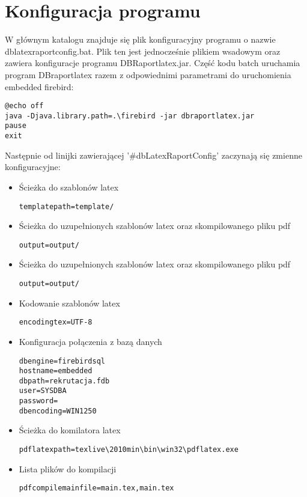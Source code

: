 \section{Konfiguracja programu}

W głównym katalogu znajduje się plik konfiguracyjny programu o nazwie  dblatexraportconfig.bat. Plik ten jest jednocześnie plikiem wsadowym oraz zawiera konfiguracje programu DBRaportlatex.jar. Część kodu batch uruchamia program DBraportlatex razem z odpowiednimi parametrami do uruchomienia embedded firebird:
 \begin{verbatim}
@echo off
java -Djava.library.path=.\firebird -jar dbraportlatex.jar
pause
exit
\end{verbatim}

Następnie od linijki zawierającej '\#dbLatexRaportConfig' zaczynają się zmienne konfiguracyjne:
  \begin{itemize}
  \item Ścieżka do szablonów latex
   \begin{verbatim}
templatepath=template/
  \end{verbatim}
  \item Ścieżka do uzupełnionych szablonów latex oraz skompilowanego pliku pdf
  \begin{verbatim}
output=output/
 \end{verbatim}
 \item Ścieżka do uzupełnionych szablonów latex oraz skompilowanego pliku pdf
  \begin{verbatim}
output=output/
 \end{verbatim}
  \item Kodowanie szablonów latex
   \begin{verbatim}
encodingtex=UTF-8
  \end{verbatim}
   \item Konfiguracja połączenia z bazą danych
    \begin{verbatim}
dbengine=firebirdsql
hostname=embedded
dbpath=rekrutacja.fdb
user=SYSDBA
password=
dbencoding=WIN1250
   \end{verbatim}
  \item Ścieżka do komilatora latex
   \begin{verbatim}
pdflatexpath=texlive\2010min\bin\win32\pdflatex.exe
  \end{verbatim}
    \item Lista plików do kompilacji
 \begin{verbatim}
pdfcompilemainfile=main.tex,main.tex
\end{verbatim}
\end{itemize}
